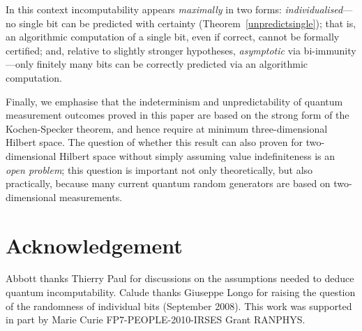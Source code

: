 \documentclass[%
 superscriptaddress,
 preprint,
 showpacs,
 showkeys,
 preprintnumbers,
 nofootinbib,
  amsmath,amssymb,
  aps,
 pra,
  longbibliography,
  floatfix,
 ]{revtex4-1}
\theoremstyle{definition}
\begin{document}
In this context incomputability appears \emph{maximally} in two forms: \emph{individualised}---no single bit can be predicted with certainty (Theorem~\ref{unpredictsingle}); that is,  an algorithmic computation
of a single bit, even if correct, cannot be formally certified; and, relative to slightly stronger hypotheses, \emph{asymptotic} via  bi-immunity---only finitely many bits can be correctly predicted via an algorithmic computation.

Finally, we  emphasise that the indeterminism and unpredictability of quantum measurement outcomes proved in this paper are based on the  strong form of the Kochen-Specker theorem, and hence require at minimum three-dimensional Hilbert space.
The question of whether this result can also proven for two-dimensional Hilbert space without simply assuming value indefiniteness is an \emph{open problem};
this question is important not only theoretically, but also practically, because many current quantum random generators are based on two-dimensional  measurements.

\section*{Acknowledgement} 
Abbott thanks Thierry Paul for discussions on the assumptions needed to deduce quantum incomputability.
Calude thanks Giuseppe Longo for raising the question of the randomness of individual bits
(September 2008).
This work was supported in part by Marie Curie FP7-PEOPLE-2010-IRSES Grant RANPHYS.


\end{document}
